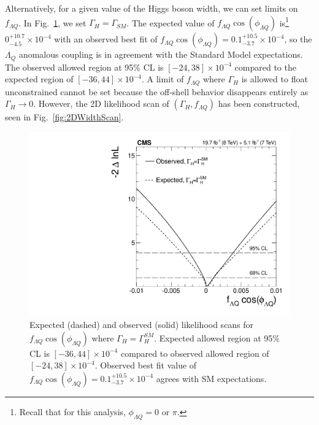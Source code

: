 Alternatively, for a given value of the Higgs boson width, we can set limits on $f_{\Lambda Q}$. In Fig.~\ref{fig:fLQLimits}, we set $\Gamma_{H}=\Gamma_{SM}$. The expected value of $f_{\Lambda Q}\cos(\phi_{\Lambda Q})$ is\footnote{Recall that for this analysis, $\phi_{\Lambda Q}=0$ or $\pi$.} $0 ^{+10.7}_{-4.5} \times 10^{-4}$ with an observed best fit of $f_{\Lambda Q}\cos(\phi_{\Lambda Q}) = 0.1 ^{+10.5}_{-3.7} \times 10^{-4}$, so the $\Lambda_{Q}$ anomalous coupling is in agreement with the Standard Model expectations. The observed allowed region at 95\% CL is $[-24,38]\times 10^{-4}$ compared to the expected region of $[-36,44] \times 10^{-4}$. A limit of $f_{\Lambda Q}$ where $\Gamma_H$ is allowed to float unconstrained cannot be set because the off-shell behavior disappears entirely as $\Gamma_{H}\rightarrow0$. However, the 2D likelihood scan of $(\Gamma_{H},f_{\Lambda Q})$ has been constructed, seen in Fig.~\ref{fig:2DWidthScan}.

\begin{figure}[htbp]
\begin{center}
\includegraphics[width=.9\linewidth]{HiggsProperties/figures/width_1DScan_fLQ.pdf}
\caption[Expected and Observed Limits on $f_{\Lambda Q}\cos(\phi_{\Lambda Q})$]{Expected (dashed) and observed (solid) likelihood scans for $f_{\Lambda Q}\cos(\phi_{\Lambda Q})$ where $\Gamma_{H}=\Gamma_{H}^{SM}$. Expected allowed region at 95\% CL is $[-36,44] \times 10^{-4}$ compared to observed allowed region of $[-24,38]\times 10^{-4}$. Observed best fit value of $f_{\Lambda Q}\cos(\phi_{\Lambda Q})=0.1 ^{+10.5}_{-3.7} \times 10^{-4}$ agrees with SM expectations.}
\label{fig:fLQLimits}
\end{center}
\end{figure}


